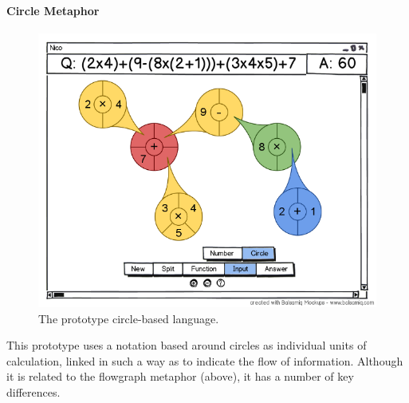 \documentclass[12pt,twoside,notitlepage,xetex]{report}
\begin{document}

\paragraph{Circle Metaphor}\hfill

\begin{figure}[H]
\begin{center}
\includegraphics[width=\textwidth]{figs/mockups/circles/nico_circmock.png}
\caption{The prototype circle-based language.}
\end{center}
\end{figure}

This prototype uses a notation based around circles as individual units of
calculation, linked in such a way as to indicate the flow of information.
Although it is related to the flowgraph metaphor (above), it has a number of
key differences.
\end{document}
